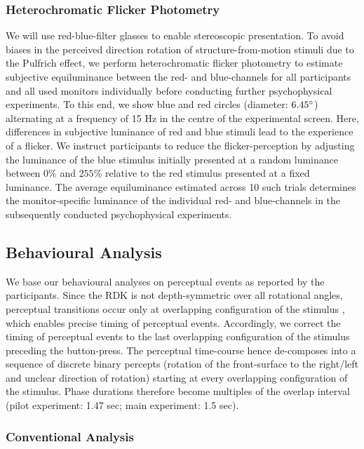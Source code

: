 \documentclass[12pt]{article}
\begin{document}
\subsubsection{Heterochromatic Flicker Photometry}
We will use red-blue-filter glasses to enable stereoscopic presentation. To avoid biases in the perceived direction rotation of structure-from-motion stimuli due to the Pulfrich effect, we perform heterochromatic flicker photometry to estimate subjective equiluminance between the red- and blue-channels for all participants and all used monitors individually before conducting further psychophysical experiments. To this end, we show blue and red circles (diameter: $6.45\degree$) alternating at a frequency of 15 Hz in the centre of the experimental screen. Here, differences in subjective luminance of red and blue stimuli lead to the experience of a flicker. We instruct participants to reduce the flicker-perception by adjusting the luminance of the blue stimulus initially presented at a random luminance between $0\%$ and $255\%$ relative to the red stimulus presented at a fixed luminance. The average equiluminance estimated across 10 such trials determines the monitor-specific luminance of the individual red- and blue-channels in the subsequently conducted psychophysical experiments. 

\subsection{Behavioural Analysis}
We base our behavioural analyses on perceptual events as reported by the participants. Since the RDK is not depth-symmetric over all rotational angles, perceptual transitions occur only at overlapping configuration of the stimulus \parencite{Pastukhov2012a, Weilnhammer2013}, which enables precise timing of perceptual events. Accordingly, we correct the timing of perceptual events to the last overlapping configuration of the stimulus preceding the button-press. The perceptual time-course hence de-composes into a sequence of discrete binary percepts (rotation of the front-surface to the right/left and unclear direction of rotation) starting at every overlapping configuration of the stimulus. Phase durations therefore become multiples of the overlap interval (pilot experiment: 1.47 sec; main experiment: 1.5 sec). 

\subsubsection{Conventional Analysis}
\end{document}
